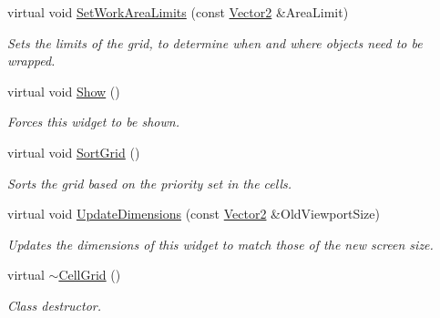\begin{DoxyCompactItemize}
virtual void \hyperlink{classphys_1_1UI_1_1CellGrid_a785a41fd3e38dbd5a58d9a4f72f06a26}{SetWorkAreaLimits} (const \hyperlink{classphys_1_1Vector2}{Vector2} \&AreaLimit)
\begin{DoxyCompactList}\small\item\em Sets the limits of the grid, to determine when and where objects need to be wrapped. \item\end{DoxyCompactList}\item 
\hypertarget{classphys_1_1UI_1_1CellGrid_a772ea260724d009cfe6241e8dac5585b}{
virtual void \hyperlink{classphys_1_1UI_1_1CellGrid_a772ea260724d009cfe6241e8dac5585b}{Show} ()}
\label{classphys_1_1UI_1_1CellGrid_a772ea260724d009cfe6241e8dac5585b}

\begin{DoxyCompactList}\small\item\em Forces this widget to be shown. \item\end{DoxyCompactList}\item 
\hypertarget{classphys_1_1UI_1_1CellGrid_ae539f6b21c3ed84852df37153ae2aebf}{
virtual void \hyperlink{classphys_1_1UI_1_1CellGrid_ae539f6b21c3ed84852df37153ae2aebf}{SortGrid} ()}
\label{classphys_1_1UI_1_1CellGrid_ae539f6b21c3ed84852df37153ae2aebf}

\begin{DoxyCompactList}\small\item\em Sorts the grid based on the priority set in the cells. \item\end{DoxyCompactList}\item 
virtual void \hyperlink{classphys_1_1UI_1_1CellGrid_addbc1338b3b321018cbaf3ff787837e5}{UpdateDimensions} (const \hyperlink{classphys_1_1Vector2}{Vector2} \&OldViewportSize)
\begin{DoxyCompactList}\small\item\em Updates the dimensions of this widget to match those of the new screen size. \item\end{DoxyCompactList}\item 
\hypertarget{classphys_1_1UI_1_1CellGrid_ac1abc38620bbb790afb01443cb2d6853}{
virtual \hyperlink{classphys_1_1UI_1_1CellGrid_ac1abc38620bbb790afb01443cb2d6853}{$\sim$CellGrid} ()}
\label{classphys_1_1UI_1_1CellGrid_ac1abc38620bbb790afb01443cb2d6853}

\begin{DoxyCompactList}\small\item\em Class destructor. \item\end{DoxyCompactList}\end{DoxyCompactItemize}
